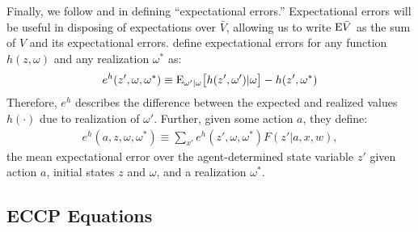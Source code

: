 \documentclass[11pt]{article}
\newcommand{\Exp}{\textnormal{E}}
\begin{document}
Finally, we follow \citet{scott2013} and \citet{kalouptsidi2020} in defining ``expectational errors.'' Expectational errors will be useful in disposing of expectations over $\bar{V}$, allowing us to write $\Exp \bar{V}$ as the sum of $V$ and its expectational errors. \citet{kalouptsidi2020} define expectational errors for any function $h(z,\omega)$ and any realization $\omega^*$ as:
\begin{align}
e^h(z',\omega,\omega^*) \equiv \Exp_{\omega'|\omega} \big[ h(z',\omega')|\omega\big] - h(z',\omega^*)
\end{align} 
Therefore, $e^h$ describes the difference between the expected and realized values $h(\cdot)$ due to realization of $\omega'$. Further, given some action $a$, they define:
\begin{align}
e^h(a, z, \omega, \omega^*) \equiv \sum_{x'} e^h(z',\omega,\omega^*) F(z'|a,x,w),
\end{align} 
the mean expectational error over the agent-determined state variable $z'$ given action $a$, initial states $z$ and $\omega$, and a realization $\omega^*$.

\subsection{ECCP Equations}
\end{document}
